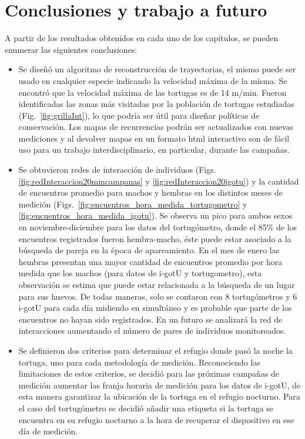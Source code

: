 \chapter{Conclusiones y trabajo a futuro}
A partir de los resultados obtenidos en cada uno de los capítulos, 
se pueden enumerar las siguientes conclusiones:

\begin{itemize}

\item Se diseñó un algoritmo de reconstrucción de trayectorias, el mismo puede ser usado en cualquier especie indicando la velocidad máxima de la misma. Se encontró que la velocidad máxima de las tortugas es de 14 m/min. Fueron identificadas las zonas más visitadas por la población de tortugas estudiadas (Fig.~\ref{fig:grillaInt}), lo que podría ser útil para diseñar políticas de conservación. Los mapas de recurrencias podrán ser actualizados con nuevas mediciones y al devolver mapas en un formato html interactivo son de fácil uso para un trabajo interdisciplinario, en particular, durante las campañas.
 
\item Se obtuvieron redes  de interacción de individuos (Figs. \ref{fig:redInteraccion20mincampanas} y \ref{fig:redInteraccion20igotu}) y la cantidad de encuentros promedio para machos y hembras en los distintos meses de medición (Figs.~\ref{fig:encuentros_hora_medida_tortugometro} y \ref{fig:encuentros_hora_medida_igotu}). Se observa un pico para ambos sexos en noviembre-diciembre para los datos del tortugómetro, donde el 85\% de los encuentros registrados fueron hembra-macho, éste puede estar asociado a la búsqueda de pareja en la época de apareamiento. En el mes de enero las hembras presentan una mayor cantidad de encuentros promedio por hora medida que los machos (para datos de i-gotU y tortugometro), esta observación se estima que puede estar relacionada a la búsqueda de un lugar para sus huevos. De todas maneras, solo se contaron con 8 tortugómetros y 6 i-gotU  para cada día midiendo en simultáneo y es probable que parte de los encuentros no hayan sido registrados. En un futuro se analizará la red de interacciones aumentando el número de pares de individuos monitoreados.
 
 
\item Se definieron dos criterios para determinar el refugio donde pasó la noche la tortuga, uno para cada metodología de medición. Reconociendo las limitaciones de estos criterios, se decidió para las próximas campañas de medición aumentar las franja horaria de medición para los datos de i-gotU, de esta manera garantizar la ubicación de la tortuga en el refugio nocturno. Para el caso del tortugómetro se decidió añadir una etiqueta si la tortuga se encuentra en su refugio nocturno a la hora de recuperar el dispositivo en ese día de medición.
 

\end{itemize}
